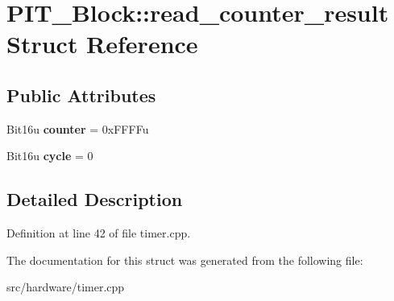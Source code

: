 \hypertarget{structPIT__Block_1_1read__counter__result}{\section{P\-I\-T\-\_\-\-Block\-:\-:read\-\_\-counter\-\_\-result Struct Reference}
\label{structPIT__Block_1_1read__counter__result}
}
\subsection*{Public Attributes}
\begin{DoxyCompactItemize}
\item 
\hypertarget{structPIT__Block_1_1read__counter__result_aea711100b018a3062712a4ecb0b3958c}{Bit16u {\bfseries counter} = 0x\-F\-F\-F\-Fu}\label{structPIT__Block_1_1read__counter__result_aea711100b018a3062712a4ecb0b3958c}

\item 
\hypertarget{structPIT__Block_1_1read__counter__result_ac00df8c322b271dd724e149614a1c7ab}{Bit16u {\bfseries cycle} = 0}\label{structPIT__Block_1_1read__counter__result_ac00df8c322b271dd724e149614a1c7ab}

\end{DoxyCompactItemize}


\subsection{Detailed Description}


Definition at line 42 of file timer.\-cpp.



The documentation for this struct was generated from the following file\-:\begin{DoxyCompactItemize}
\item 
src/hardware/timer.\-cpp\end{DoxyCompactItemize}
